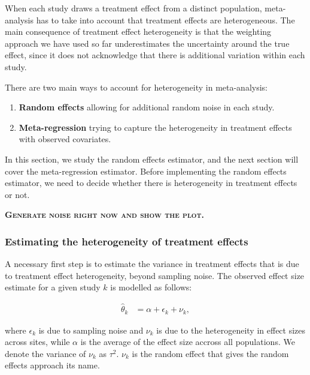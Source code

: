 \documentclass[
]{book}
\providecommand{\tightlist}{%
  \setlength{\itemsep}{0pt}\setlength{\parskip}{0pt}}
\theoremstyle{definition}
\theoremstyle{definition}
\theoremstyle{definition}
\theoremstyle{definition}
\theoremstyle{remark}
\begin{document}
When each study draws a treatment effect from a distinct population, meta-analysis has to take into account that treatment effects are heterogeneous.
The main consequence of treatment effect heterogeneity is that the weighting approach we have used so far underestimates the uncertainty around the true effect, since it does not acknowledge that there is additional variation within each study.

There are two main ways to account for heterogeneity in meta-analysis:

\begin{enumerate}
\def\labelenumi{\arabic{enumi}.}
\tightlist
\item
  \textbf{Random effects} allowing for additional random noise in each study.
\item
  \textbf{Meta-regression} trying to capture the heterogeneity in treatment effects with observed covariates.
\end{enumerate}

In this section, we study the random effects estimator, and the next section will cover the meta-regression estimator.
Before implementing the random effects estimator, we need to decide whether there is heterogeneity in treatment effects or not.

\textbf{\textsc{Generate noise right now and show the plot.}}

\hypertarget{estimating-the-heterogeneity-of-treatment-effects}{%
\subsubsection{Estimating the heterogeneity of treatment effects}\label{estimating-the-heterogeneity-of-treatment-effects}}

A necessary first step is to estimate the variance in treatment effects that is due to treatment effect heterogeneity, beyond sampling noise.
The observed effect size estimate for a given study \(k\) is modelled as follows:

\begin{align*}
\hat{\theta}_k & = \alpha + \epsilon_k + \nu_k,
\end{align*}

where \(\epsilon_k\) is due to sampling noise and \(\nu_k\) is due to the heterogeneity in effect sizes across sites, while \(\alpha\) is the average of the effect size accross all populations.
We denote the variance of \(\nu_k\) as \(\tau^2\).
\(\nu_k\) is the random effect that gives the random effects approach its name.
\end{document}
